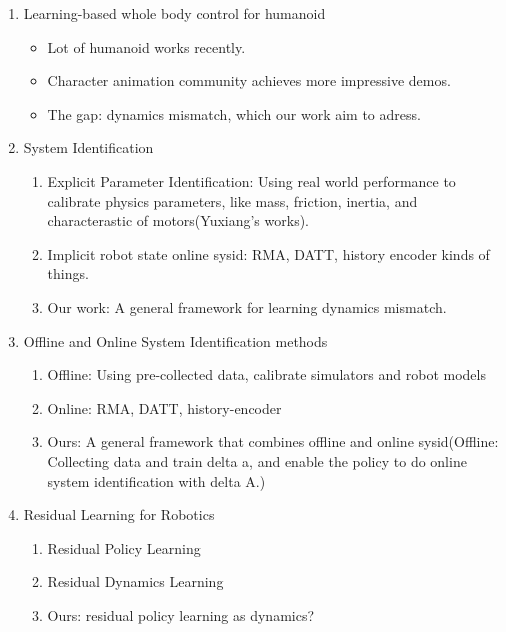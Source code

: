 
\begin{enumerate}
    \item Learning-based whole body control for humanoid
    \begin{itemize}
        \item Lot of humanoid works recently.
        \item Character animation community achieves more impressive demos.
        \item The gap: dynamics mismatch, which our work aim to adress.
    \end{itemize}
    
    \item System Identification 
    \begin{enumerate}
        \item Explicit Parameter Identification: Using real world performance to calibrate physics parameters, like mass, friction, inertia, and characterastic of motors(Yuxiang's works).
        \item Implicit robot state online sysid: RMA, DATT, history encoder kinds of things.
        \item Our work: A general framework for learning dynamics mismatch.
    \end{enumerate}
    \item Offline and Online System Identification methods
    \begin{enumerate}
        \item Offline: Using pre-collected data, calibrate simulators and robot models
        \item Online: RMA, DATT, history-encoder
        \item Ours: A general framework that combines offline and online sysid(Offline: Collecting data and train delta a, and enable the policy to do online system identification with delta A.)
    \end{enumerate}
    \item Residual Learning for Robotics
    \begin{enumerate}
        \item Residual Policy Learning
        \item Residual Dynamics Learning
        \item Ours: residual policy learning as dynamics?
    \end{enumerate}
\end{enumerate}


